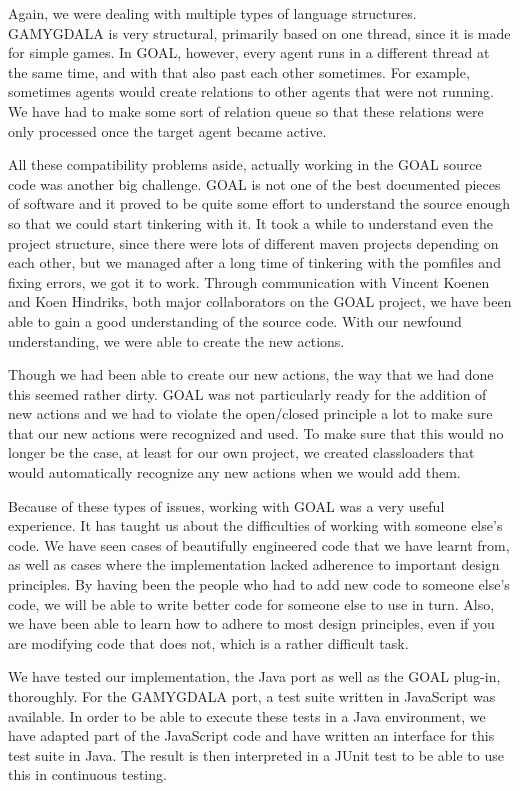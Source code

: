Again, we were dealing with multiple types of language structures. GAMYGDALA is very structural, primarily based on one thread, since it is made for simple games. In GOAL, however, every agent runs in a different thread at the same time, and with that also past each other sometimes. For example, sometimes agents would create relations to other agents that were not running. We have had to make some sort of relation queue so that these relations were only processed once the target agent became active.

All these compatibility problems aside, actually working in the GOAL source code was another big challenge. GOAL is not one of the best documented pieces of software and it proved to be quite some effort to understand the source enough so that we could start tinkering with it. It took a while to understand even the project structure, since there were lots of different maven projects depending on each other, but we managed after a long time of tinkering with the pomfiles and fixing errors, we got it to work. Through communication with Vincent Koenen and Koen Hindriks, both major collaborators on the GOAL project, we have been able to gain a good understanding of the source code. With our newfound understanding, we were able to create the new actions.

Though we had been able to create our new actions, the way that we had done this seemed rather dirty. GOAL was not particularly ready for the addition of new actions and we had to violate the open/closed principle a lot to make sure that our new actions were recognized and used. To make sure that this would no longer be the case, at least for our own project, we created classloaders that would automatically recognize any new actions when we would add them.

Because of these types of issues, working with GOAL was a very useful experience. It has taught us about the difficulties of working with someone else's code. We have seen cases of beautifully engineered code that we have learnt from, as well as cases where the implementation lacked adherence to important design principles. By having been the people who had to add new code to someone else's code, we will be able to write better code for someone else to use in turn. Also, we have been able to learn how to adhere to most design principles, even if you are modifying code that does not, which is a rather difficult task.

We have tested our implementation, the Java port as well as the GOAL plug-in, thoroughly. For the GAMYGDALA port, a test suite written in JavaScript was available. In order to be able to execute these tests in a Java environment, we have adapted part of the JavaScript code and have written an interface for this test suite in Java. The result is then interpreted in a JUnit test to be able to use this in continuous testing.

